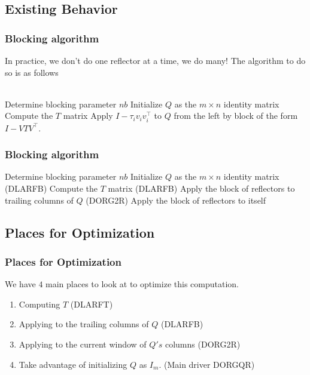 \documentclass[12pt,aspectratio=169]{beamer}
\begin{document}
    \subsection{Existing Behavior}
    \begin{frame}
        \frametitle{Blocking algorithm}
        In practice, we don't do one reflector at a time, we do many! The algorithm to do so is as follows\\\,\\
        \begin{algorithmic}[1]
            \State Determine blocking parameter $nb$
            \State Initialize $Q$ as the $m\times n$ identity matrix
            \State Compute the $T$ matrix
            \State Apply $I-\tau_iv_iv_i^\top$ to $Q$ from the left by block of the form $I-VTV^\top$.
            \EndFor
        \end{algorithmic}
    \end{frame}
    \begin{frame}
        \frametitle{Blocking algorithm}
        \begin{algorithmic}[1]
            \State Determine blocking parameter $nb$
            \State Initialize $Q$ as the $m\times n$ identity matrix
            \State (DLARFB) Compute the $T$ matrix
            \State (DLARFB) Apply the block of reflectors to trailing columns of $Q$
            \State (DORG2R) Apply the block of reflectors to itself 
            \EndFor
        \end{algorithmic}
    \end{frame}
    \subsection{Places for Optimization}
    \begin{frame}
        \frametitle{Places for Optimization}
        We have $4$ main places to look at to optimize this computation.
        \begin{enumerate}
            \item Computing $T$ (DLARFT)
            \item Applying to the trailing columns of $Q$ (DLARFB)
            \item Applying to the current window of $Q's$ columns (DORG2R)
            \item Take advantage of initializing $Q$ as $I_m$. (Main driver DORGQR)
        \end{enumerate}
    \end{frame}
\end{document}
